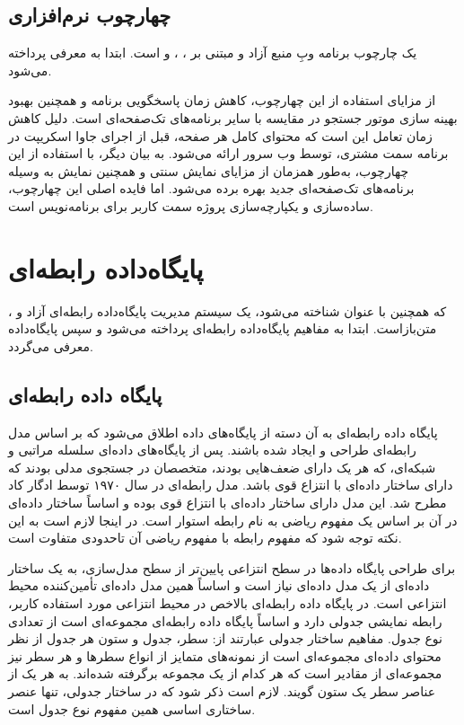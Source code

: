 {\subsection{چهارچوب نرم‌افزاری }
\cite{Nuxt} یک چارچوب برنامه وبِ منبع آزاد و مبتنی بر  ،  ،  و  است.
  ابتدا به معرفی  پرداخته می‌شود.

از مزایای استفاده از این چهارچوب، کاهش زمان پاسخگویی برنامه و همچنین بهبود بهینه سازی موتور جستجو در مقایسه با سایر برنامه‌های تک‌صفحه‌ای است. دلیل کاهش زمان تعامل این است که محتوای کامل هر صفحه، قبل از اجرای جاوا اسکریپت در برنامه سمت مشتری، توسط وب سرور ارائه می‌شود. به بیان دیگر، با استفاده از این چهارچوب، به‌طور همزمان از مزایای نمایش سنتی  و همچنین نمایش به وسیله برنامه‌های تک‌صفحه‌ای جدید بهره برده می‌شود.
اما فایده اصلی این چهارچوب، ساده‌سازی و یکپارچه‌سازی پروژه سمت کاربر برای برنامه‌نویس است.


\section{پایگاه‌داده رابطه‌ای }
\cite{Postgress}، که همچنین با عنوان  شناخته می‌شود، یک سیستم مدیریت پایگاه‌داده رابطه‌ای آزاد و متن‌بازاست. ابتدا به مفاهیم پایگاه‌داده رابطه‌ای پرداخته می‌شود و سپس پایگاه‌داده  معرفی می‌گردد.
 
\subsection{پایگاه داده رابطه‌ای}
پایگاه داده رابطه‌ای به آن دسته از پایگاه‌های داده اطلاق می‌شود که بر اساس مدل رابطه‌ای طراحی و ایجاد شده باشند. پس از پایگاه‌های داده‌ای سلسله مراتبی و شبکه‌ای، که هر یک دارای ضعف‌هایی بودند، متخصصان در جستجوی مدلی بودند که دارای ساختار داده‌ای با انتزاع قوی باشد. مدل رابطه‌ای در سال ۱۹۷۰ توسط ادگار کاد مطرح شد. این مدل دارای ساختار داده‌ای با انتزاع قوی بوده و اساساً ساختار داده‌ای در آن بر اساس یک مفهوم ریاضی به نام رابطه استوار است. در اینجا لازم است به این نکته توجه شود که مفهوم رابطه با مفهوم ریاضی آن تاحدودی متفاوت است.
 
برای طراحی پایگاه داده‌ها در سطح انتزاعی پایین‌تر از سطح مدل‌سازی، به یک ساختار داده‌ای از یک مدل داده‌ای نیاز است و اساساً همین مدل داده‌ای تأمین‌کننده محیط انتزاعی است. در پایگاه داده رابطه‌ای بالاخص در محیط انتزاعی مورد استفاده کاربر، رابطه نمایشی جدولی دارد و اساساً پایگاه داده رابطه‌ای مجموعه‌ای است از تعدادی نوع جدول. مفاهیم ساختار جدولی عبارتند از: سطر، جدول و ستون
هر جدول از نظر محتوای داده‌ای مجموعه‌ای است از نمونه‌های متمایز از انواع سطرها و هر سطر نیز مجموعه‌ای از مقادیر است که هر کدام از یک مجموعه برگرفته شده‌اند. به هر یک از عناصر سطر یک ستون گویند. لازم است ذکر شود که در ساختار جدولی، تنها عنصر ساختاری اساسی همین مفهوم نوع جدول است.
 
}
